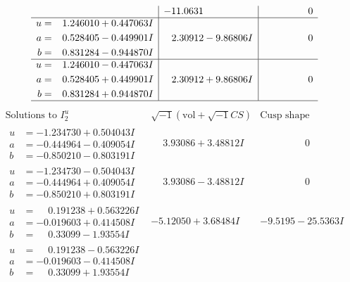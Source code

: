 \documentclass[1p]{elsarticle_modified}
\theoremstyle{definition}
\newcommand{\I}{\sqrt{-1}}
\begin{document}
$$\begin{array}{c|c|c}
 & -11.0631\phantom{ +0.000000I} & \phantom{-0.000000 } 0 \\ \hline\begin{aligned}
u &= \phantom{-}1.246010 + 0.447063 I \\
a &= \phantom{-}0.528405 - 0.449901 I \\
b &= \phantom{-}0.831284 - 0.944870 I\end{aligned}
 & \phantom{-}2.30912 - 9.86806 I & \phantom{-0.000000 } 0 \\ \hline\begin{aligned}
u &= \phantom{-}1.246010 - 0.447063 I \\
a &= \phantom{-}0.528405 + 0.449901 I \\
b &= \phantom{-}0.831284 + 0.944870 I\end{aligned}
 & \phantom{-}2.30912 + 9.86806 I & \phantom{-0.000000 } 0\\
 \hline 
 \end{array}$$\newpage$$\begin{array}{c|c|c}  
\text{Solutions to }I^u_{2}& \I (\text{vol} + \sqrt{-1}CS) & \text{Cusp shape}\\
 \hline 
\begin{aligned}
u &= -1.234730 + 0.504043 I \\
a &= -0.444964 - 0.409054 I \\
b &= -0.850210 - 0.803191 I\end{aligned}
 & \phantom{-}3.93086 + 3.48812 I & \phantom{-0.000000 } 0 \\ \hline\begin{aligned}
u &= -1.234730 - 0.504043 I \\
a &= -0.444964 + 0.409054 I \\
b &= -0.850210 + 0.803191 I\end{aligned}
 & \phantom{-}3.93086 - 3.48812 I & \phantom{-0.000000 } 0 \\ \hline\begin{aligned}
u &= \phantom{-}0.191238 + 0.563226 I \\
a &= -0.019603 + 0.414508 I \\
b &= \phantom{-}0.33099 - 1.93554 I\end{aligned}
 & -5.12050 + 3.68484 I & -9.5195 - 25.5363 I \\ \hline\begin{aligned}
u &= \phantom{-}0.191238 - 0.563226 I \\
a &= -0.019603 - 0.414508 I \\
b &= \phantom{-}0.33099 + 1.93554 I\end{aligned}

\end{array}$$
\end{document}
